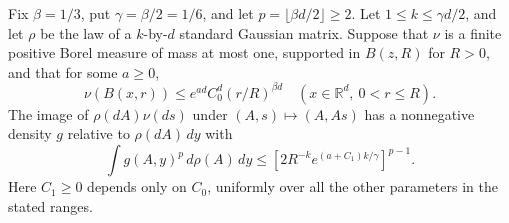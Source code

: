 \begin{lemma}
\label{l:finite-entropy:projection}
Fix \(\beta=1/3\), put \(\gamma=\beta/2=1/6\), and let
\(p=\lfloor\beta d/2\rfloor\ge2\).  Let \(1\le k\le\gamma d/2\),
and let \(\rho\) be the law of a \(k\)-by-\(d\) standard Gaussian
matrix.  Suppose that \(\nu\) is a finite positive Borel measure
of mass at most one, supported in \(B(z,R)\) for \(R>0\), and
that for some \(a\ge0\),
\[
 \nu(B(x,r))\le e^{ad}C_0^d(r/R)^{\beta d}
 \quad(x\in\mathbb R^d,\ 0<r\le R).
\]
The image of \(\rho(dA)\nu(ds)\) under \((A,s)\mapsto(A,As)\)
has a nonnegative density \(g\) relative to \(\rho(dA)\,dy\) with
\begin{equation}\label{l:finite-entropy:projection-moment}
 \int g(A,y)^p\,d\rho(A)\,dy
 \le\left[2R^{-k}e^{(a+C_1)k/\gamma}\right]^{p-1}.
\end{equation}
Here \(C_1\ge0\) depends only on \(C_0\), uniformly over all the
other parameters in the stated ranges.
\end{lemma}

